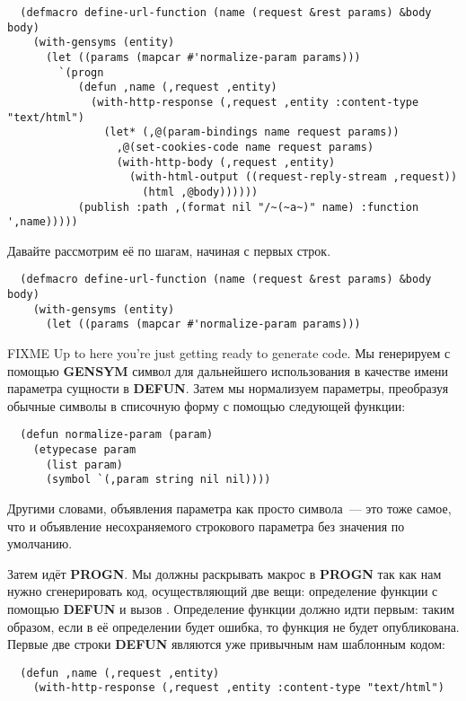 \begin{lstlisting}
  (defmacro define-url-function (name (request &rest params) &body body)
    (with-gensyms (entity)
      (let ((params (mapcar #'normalize-param params)))
        `(progn
           (defun ,name (,request ,entity)
             (with-http-response (,request ,entity :content-type "text/html")
               (let* (,@(param-bindings name request params))
                 ,@(set-cookies-code name request params)
                 (with-http-body (,request ,entity)
                   (with-html-output ((request-reply-stream ,request))
                     (html ,@body))))))
           (publish :path ,(format nil "/~(~a~)" name) :function ',name)))))
\end{lstlisting}

Давайте рассмотрим её по шагам, начиная с первых строк.

\begin{lstlisting}
  (defmacro define-url-function (name (request &rest params) &body body)
    (with-gensyms (entity)
      (let ((params (mapcar #'normalize-param params)))
\end{lstlisting}

FIXME Up to here you're just getting ready to generate code. Мы генерируем с помощью
\textbf{GENSYM} символ для дальнейшего использования в качестве имени параметра сущности в
\textbf{DEFUN}. Затем мы нормализуем параметры, преобразуя обычные символы в списочную
форму с помощью следующей функции:

\begin{lstlisting}
  (defun normalize-param (param)
    (etypecase param
      (list param)
      (symbol `(,param string nil nil))))
\end{lstlisting}

Другими словами, объявления параметра как просто символа~--- это тоже самое, что и
объявление несохраняемого строкового параметра без значения по умолчанию.

Затем идёт \textbf{PROGN}. Мы должны раскрывать макрос в \textbf{PROGN} так как нам нужно
сгенерировать код, осуществляющий две вещи: определение функции с помощью \textbf{DEFUN} и
вызов . Определение функции должно идти первым: таким образом, если в её
определении будет ошибка, то функция не будет опубликована. Первые две строки
\textbf{DEFUN} являются уже привычным нам шаблонным кодом:

\begin{lstlisting}
  (defun ,name (,request ,entity)
    (with-http-response (,request ,entity :content-type "text/html")  
\end{lstlisting}

